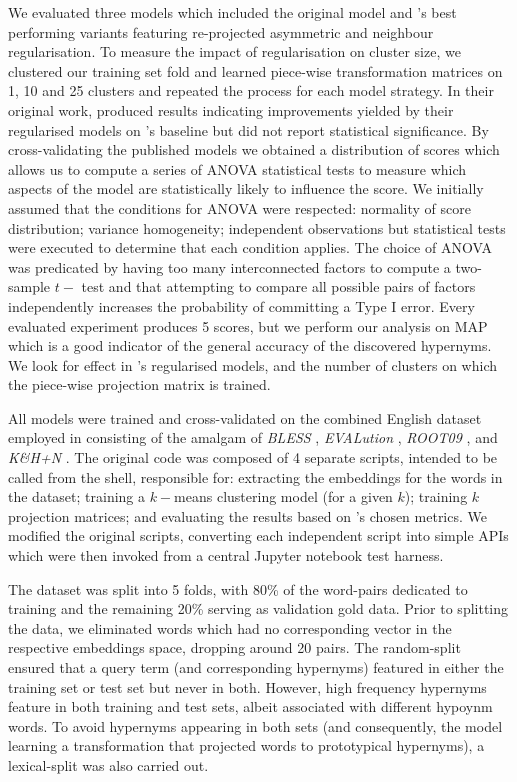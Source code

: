 We evaluated three models which included the original \citep{Fu2014} model and \citeauthor{ustalov2017negative}'s best performing variants featuring re-projected asymmetric and neighbour regularisation.  To measure the impact of regularisation on cluster size, we clustered our training set fold and learned piece-wise transformation matrices on 1, 10 and 25 clusters and repeated the process for each model strategy.  In their original work, \citeauthor{ustalov2017negative} produced results indicating improvements yielded by their regularised models on \citep{Fu2014}'s baseline but did not report statistical significance.  By cross-validating the published models we obtained a distribution of scores which allows us to compute a series of \ac{ANOVA} statistical tests to measure which aspects of the model are statistically likely to influence the score.  We initially assumed that the conditions for \ac{ANOVA} were respected: normality of score distribution; variance homogeneity; independent observations but statistical tests were executed to determine that each condition applies.  The choice of \ac{ANOVA} was predicated by having too many interconnected factors to compute a two-sample $t-$ test and that attempting to compare all possible pairs of factors independently increases the probability of committing a Type I error.  Every evaluated experiment produces 5 scores, but we perform our analysis on \ac{MAP} which is a good indicator of the general accuracy of the discovered hypernyms.  We look for effect in \citeauthor{ustalov2017negative}'s regularised models, and the number of clusters on which the piece-wise projection matrix is trained. 

All models were trained and cross-validated on the combined English dataset employed in \citep{ustalov2017negative} consisting of the amalgam of \textit{BLESS} \citep{Baroni2011}, \textit{EVALution} \citep{santus2015evalution}, \textit{ROOT09} \citep{santus2016nine}, and \textit{K\&H+N} \citep{necsulescu2015reading}.  The original code was composed of 4 separate scripts, intended to be called from the shell, responsible for: extracting the embeddings for the words in the dataset; training a $k-$means clustering model (for a given $k$); training $k$ projection matrices; and evaluating the results based on \citeauthor{ustalov2017negative}'s chosen metrics.  We modified the original scripts, converting each independent script into simple APIs which were then invoked from a central Jupyter notebook test harness.

The dataset was split into 5 folds, with 80\% of the word-pairs dedicated to training and the remaining 20\% serving as validation gold data.  Prior to splitting the data, we eliminated words which had no corresponding vector in the respective embeddings space, dropping around 20 pairs.  The random-split ensured that a query term (and corresponding hypernyms) featured in either the training set or test set but never in both.  However, high frequency hypernyms feature in both training and test sets, albeit associated with different hypoynm words.  To avoid hypernyms appearing in both sets (and consequently, the model learning a transformation that projected words to prototypical hypernyms), a lexical-split was also carried out.

